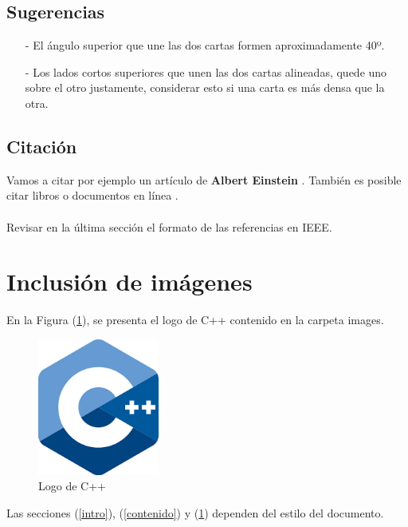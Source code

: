 \documentclass{article}
\begin{document}
\subsection{Sugerencias}
\begin{enumerate}
    \item [-]El ángulo superior que une las dos cartas formen aproximadamente 40º.
    \item[-]Los lados cortos superiores que unen las dos cartas alineadas, quede uno sobre el otro justamente, considerar esto si una carta es más densa que la otra.
\end{enumerate}
\subsection{Citación}
Vamos a citar por ejemplo un artículo de \textbf{Albert Einstein} \cite{einstein}.
También es posible citar libros \cite{dirac} o documentos en línea \cite{knuthwebsite}.\\\\
Revisar en la última sección el formato de las referencias en IEEE.



\section{Inclusión de imágenes} \label{imagenes}

En la Figura (\ref{fig:cpplogo}), se presenta el logo de C++ contenido en la carpeta images.

\begin{figure}[h]
\includegraphics[width=4cm]{cpplogo.png}
\centering
\caption{Logo de C++}
\label{fig:cpplogo}
\end{figure}

Las secciones (\ref{intro}), (\ref{contenido}) y (\ref{imagenes}) dependen del estilo del documento.



\end{document}
